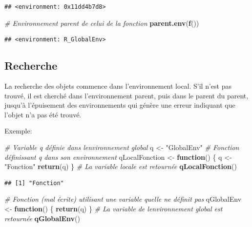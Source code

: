 \documentclass[
  12pt,
  french,
  a4paper,
  extrafontsizes,onecolumn,openright
  ]{memoir}
\newenvironment{Shaded}{\begin{snugshade}}{\end{snugshade}}
\newcommand{\CommentTok}[1]{\textcolor[rgb]{0.56,0.35,0.01}{\textit{#1}}}
\newcommand{\ControlFlowTok}[1]{\textcolor[rgb]{0.13,0.29,0.53}{\textbf{#1}}}
\newcommand{\FunctionTok}[1]{\textcolor[rgb]{0.13,0.29,0.53}{\textbf{#1}}}
\newcommand{\NormalTok}[1]{#1}
\newcommand{\OtherTok}[1]{\textcolor[rgb]{0.56,0.35,0.01}{#1}}
\newcommand{\StringTok}[1]{\textcolor[rgb]{0.31,0.60,0.02}{#1}}
\begin{document}
\begin{verbatim}
## <environment: 0x11dd4b7d8>
\end{verbatim}

\begin{Shaded}
\begin{Highlighting}[]
\CommentTok{\# Environnement parent de celui de la fonction}
\FunctionTok{parent.env}\NormalTok{(}\FunctionTok{f}\NormalTok{())}
\end{Highlighting}
\end{Shaded}

\begin{verbatim}
## <environment: R_GlobalEnv>
\end{verbatim}

\normalsize

\subsection{Recherche}\label{recherche}

La recherche des objets commence dans l'environnement local.
S'il n'est pas trouvé, il est cherché dans l'environnement parent, puis dans le parent du parent, jusqu'à l'épuisement des environnements qui génère une erreur indiquant que l'objet n'a pas été trouvé.

Exemple:

\scriptsize

\begin{Shaded}
\begin{Highlighting}[]
\CommentTok{\# Variable q définie dans l\textquotesingle{}environnement global}
\NormalTok{q }\OtherTok{\textless{}{-}} \StringTok{"GlobalEnv"}
\CommentTok{\# Fonction définissant q dans son environnement}
\NormalTok{qLocalFonction }\OtherTok{\textless{}{-}} \ControlFlowTok{function}\NormalTok{() \{}
\NormalTok{  q }\OtherTok{\textless{}{-}} \StringTok{"Fonction"}
  \FunctionTok{return}\NormalTok{(q)}
\NormalTok{\}}
\CommentTok{\# La variable locale est retournée}
\FunctionTok{qLocalFonction}\NormalTok{()}
\end{Highlighting}
\end{Shaded}

\begin{verbatim}
## [1] "Fonction"
\end{verbatim}

\begin{Shaded}
\begin{Highlighting}[]
\CommentTok{\# Fonction (mal écrite) utilisant une variable qu\textquotesingle{}elle ne définit pas}
\NormalTok{qGlobalEnv }\OtherTok{\textless{}{-}} \ControlFlowTok{function}\NormalTok{() \{}
   \FunctionTok{return}\NormalTok{(q)}
\NormalTok{\}}
\CommentTok{\# La variable de l\textquotesingle{}environnement global est retournée}
\FunctionTok{qGlobalEnv}\NormalTok{()}
\end{Highlighting}
\end{Shaded}
\end{document}
